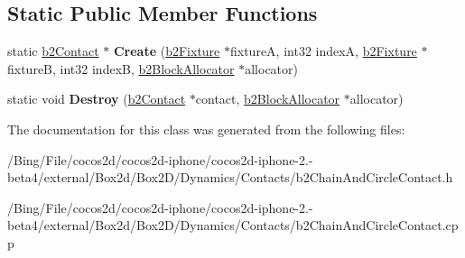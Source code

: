 \subsection*{Static Public Member Functions}
\begin{DoxyCompactItemize}
\item 
\hypertarget{classb2_chain_and_circle_contact_a9738f9b3eeddb824213abaae78ff6a73}{static \hyperlink{classb2_contact}{b2\-Contact} $\ast$ {\bfseries Create} (\hyperlink{classb2_fixture}{b2\-Fixture} $\ast$fixture\-A, int32 index\-A, \hyperlink{classb2_fixture}{b2\-Fixture} $\ast$fixture\-B, int32 index\-B, \hyperlink{classb2_block_allocator}{b2\-Block\-Allocator} $\ast$allocator)}\label{classb2_chain_and_circle_contact_a9738f9b3eeddb824213abaae78ff6a73}

\item 
\hypertarget{classb2_chain_and_circle_contact_a1070fc727a3c52a160c7919c9650b4e3}{static void {\bfseries Destroy} (\hyperlink{classb2_contact}{b2\-Contact} $\ast$contact, \hyperlink{classb2_block_allocator}{b2\-Block\-Allocator} $\ast$allocator)}\label{classb2_chain_and_circle_contact_a1070fc727a3c52a160c7919c9650b4e3}

\end{DoxyCompactItemize}


The documentation for this class was generated from the following files\-:\begin{DoxyCompactItemize}
\item 
/\-Bing/\-File/cocos2d/cocos2d-\/iphone/cocos2d-\/iphone-\/2.-\/beta4/external/\-Box2d/\-Box2\-D/\-Dynamics/\-Contacts/b2\-Chain\-And\-Circle\-Contact.\-h\item 
/\-Bing/\-File/cocos2d/cocos2d-\/iphone/cocos2d-\/iphone-\/2.-\/beta4/external/\-Box2d/\-Box2\-D/\-Dynamics/\-Contacts/b2\-Chain\-And\-Circle\-Contact.\-cpp\end{DoxyCompactItemize}
